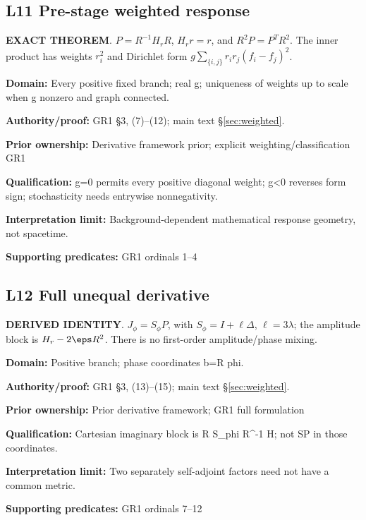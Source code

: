 \par\noindent\begin{minipage}{\linewidth}
\subsection*{L11 Pre-stage weighted response}
\textbf{EXACT THEOREM}. \(P=R^{-1}H_rR\), \(H_rr=r\), and \(R^2P=P^TR^2\). The inner product has weights \(r_i^2\) and Dirichlet form \(g\sum_{\{i,j\}}r_ir_j(f_i-f_j)^2\).\par
\textbf{Domain:} Every positive fixed branch; real g; uniqueness of weights up to scale when g nonzero and graph connected.\par
\textbf{Authority/proof:} GR1 \S{}3, (7)--(12); main text \S\ref{sec:weighted}.\par
\textbf{Prior ownership:} Derivative framework prior; explicit weighting/classification GR1\par
\textbf{Qualification:} g=0 permits every positive diagonal weight; g<0 reverses form sign; stochasticity needs entrywise nonnegativity.\par
\textbf{Interpretation limit:} Background-dependent mathematical response geometry, not spacetime.\par
\textbf{Supporting predicates:} GR1 ordinals 1--4\par
\end{minipage}\par\medskip
\par\noindent\begin{minipage}{\linewidth}
\subsection*{L12 Full unequal derivative}
\textbf{DERIVED IDENTITY}. \(J_\phi=S_\phi P\), with \(S_\phi=I+\ell\Delta\), \(\ell=3\lambda\); the amplitude block is \(H_r-2\eps R^2\). There is no first-order amplitude/phase mixing.\par
\textbf{Domain:} Positive branch; phase coordinates b=R phi.\par
\textbf{Authority/proof:} GR1 \S{}3, (13)--(15); main text \S\ref{sec:weighted}.\par
\textbf{Prior ownership:} Prior derivative framework; GR1 full formulation\par
\textbf{Qualification:} Cartesian imaginary block is R S\_phi R\textasciicircum{}-1 H; not SP in those coordinates.\par
\textbf{Interpretation limit:} Two separately self-adjoint factors need not have a common metric.\par
\textbf{Supporting predicates:} GR1 ordinals 7--12\par
\end{minipage}\par\medskip

